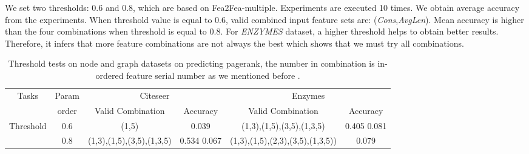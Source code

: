\documentclass[runningheads]{llncs}
\newcommand{\B}{\fontseries{b}\selectfont}
\begin{document}
    We set two thresholds: 0.6 and 0.8, which are based on Fea2Fea-multiple. Experiments are executed 10 times. We obtain average accuracy from the experiments. When threshold value is equal to 0.6, valid combined input feature sets are: (\textit{Cons},\textit{AvgLen}). Mean accuracy is higher than the four combinations when threshold is equal to 0.8. For \textit{ENZYMES} dataset, a higher threshold helps to obtain better results. Therefore, it infers that more feature combinations are not always the best which shows that we must try all combinations.
    \vspace{-0.8cm}
     \begin{center}
      \begin{table}[!htp]\scriptsize
        \centering
        \caption{Threshold tests on node and graph datasets on predicting pagerank, the number in 
combination is in-ordered feature serial number as we mentioned before .}
        \label{tab:commands}
        \begin{tabular}{*{6}{c}} \toprule
      {Tasks} & Param  & \multicolumn{2}{c}{{\sc Citeseer}} & \multicolumn{2}{c}{{\sc Enzymes}} \\
      \cmidrule(lr){3-4}\cmidrule(lr){5-6}
      & order  & Valid Combination & Accuracy  & Valid Combination & Accuracy  \\ \hline
      
      \multirow{2}{4em}{Threshold} 
      &0.6 & (1,5)&  \B0.611  0.039 & (1,3),(1,5),(3,5),(1,3,5) & 0.405  0.081 \\
      &0.8 & (1,3),(1,5),(3,5),(1,3,5)&  0.534  0.067 &(1,3),(1,5),(2,3),(3,5),(1,3,5)) & 
\B0.440  0.079 \\
      \hline
      
      \bottomrule
        \end{tabular}
      \end{table}
      \end{center}
\vspace{-1cm}
\end{document}
